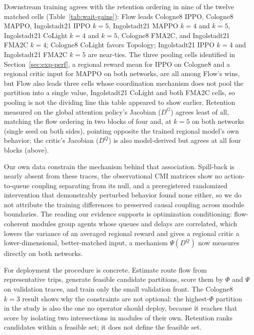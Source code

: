 \documentclass[journal]{IEEEtran}
\theoremstyle{definition}
\begin{document}
Downstream training agrees with the retention ordering in nine of the twelve matched cells (Table~\ref{tab:wait-gains}): Flow leads Cologne8 IPPO, Cologne8 MAPPO, Ingolstadt21 IPPO $k{=}5$, Ingolstadt21 MAPPO $k{=}4$ and $k{=}5$, Ingolstadt21 CoLight $k{=}4$ and $k{=}5$, Cologne8 FMA2C, and Ingolstadt21 FMA2C $k{=}4$; Cologne8 CoLight favors Topology; Ingolstadt21 IPPO $k{=}4$ and Ingolstadt21 FMA2C $k{=}5$ are near-ties.
The three pooling cells identified in Section~\ref{sec:exp-perf}, a regional reward mean for IPPO on Cologne8 and a regional critic input for MAPPO on both networks, are all among Flow's wins, but Flow also leads three cells whose coordination mechanism does not pool the partition into a single value, Ingolstadt21 CoLight and both FMA2C cells, so pooling is not the dividing line this table appeared to show earlier. Retention measured on the global attention policy's Jacobian ($D^G$) agrees least of all, matching the flow ordering in two blocks of four and, at $k=5$ on both networks (single seed on both sides), pointing opposite the trained regional model's own behavior; the critic's Jacobian ($D^Q$) is also model-derived but agrees at all four blocks (above).

Our own data constrain the mechanism behind that association.
Spill-back is nearly absent from these traces, the observational CMI matrices show no action-to-queue coupling separating from its null, and a preregistered randomized intervention that demonstrably perturbed behavior found none either, so we do not attribute the training differences to preserved causal coupling across module boundaries.
The reading our evidence supports is optimization conditioning: flow-coherent modules group agents whose queues and delays are correlated, which lowers the variance of an averaged regional reward and gives a regional critic a lower-dimensional, better-matched input, a mechanism $\Psi(D^Q)$ now measures directly on both networks.

For deployment the procedure is concrete.
Estimate route flow from representative trips, generate feasible candidate partitions, score them by $\Phi$ and $\Psi$ on validation traces, and train only the small validation front.
The Cologne8 $k=3$ result shows why the constraints are not optional: the highest-$\Phi$ partition in the study is also the one no operator should deploy, because it reaches that score by isolating two intersections in modules of their own.
Retention ranks candidates within a feasible set; it does not define the feasible set.
\end{document}
